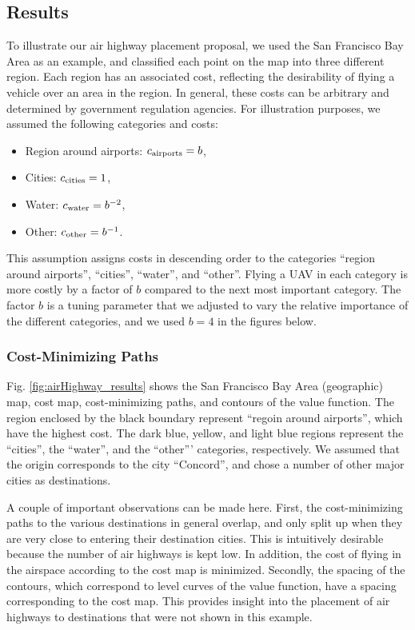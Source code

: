 \subsection{Results}
To illustrate our air highway placement proposal, we used the San Francisco Bay Area as an example, and classified each point on the map into three different region. Each region has an associated cost, reflecting the desirability of flying a vehicle over an area in the region. In general, these costs can be arbitrary and determined by government regulation agencies. For illustration purposes, we assumed the following categories and costs:

\begin{itemize}
\item Region around airports: $c_\text{airports}=b$,
\item Cities: $c_\text{cities}=1$,
\item Water: $c_\text{water}=b^{-2}$,
\item Other: $c_\text{other}=b^{-1}$.
\end{itemize}

This assumption assigns costs in descending order to the categories ``region around airports'', ``cities'', ``water'', and ``other''. Flying a UAV in each category is more costly by a factor of $b$ compared to the next most important category. The factor $b$ is a tuning parameter that we adjusted to vary the relative importance of the different categories, and we used $b=4$ in the figures below.

\subsubsection{Cost-Minimizing Paths}
Fig. \ref{fig:airHighway_results} shows the San Francisco Bay Area (geographic) map, cost map, cost-minimizing paths, and contours of the value function. The region enclosed by the black boundary represent ``regoin around airports'', which have the highest cost. The dark blue, yellow, and light blue regions represent the ``cities'', the ``water'', and the ``other''' categories, respectively. We assumed that the origin corresponds to the city ``Concord'', and chose a number of other major cities as destinations.

A couple of important observations can be made here. First, the cost-minimizing paths to the various destinations in general overlap, and only split up when they are very close to entering their destination cities. This is intuitively desirable because the number of air highways is kept low. In addition, the cost of flying in the airspace according to the cost map is minimized. Secondly, the spacing of the contours, which correspond to level curves of the value function, have a spacing corresponding to the cost map. This provides insight into the placement of air highways to destinations that were not shown in this example.

